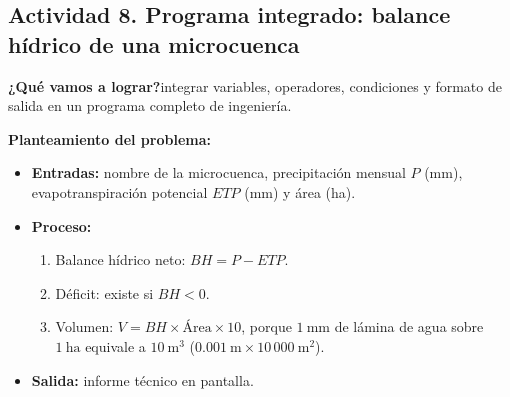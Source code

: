 \documentclass[11pt,a4paper]{article}
\newcommand{\actividad}[1]{\begin{objetivo}\textbf{\color{tealProfundo}¿Qué vamos a lograr?}\enspace #1\end{objetivo}}
\begin{document}
\subsection{Actividad 8. Programa integrado: balance hídrico de una microcuenca}
\actividad{integrar variables, operadores, condiciones y formato de salida en un programa completo de ingeniería.}

\textbf{Planteamiento del problema:}
\begin{itemize}
  \item \textbf{Entradas:} nombre de la microcuenca, precipitación mensual $P$ (mm), evapotranspiración potencial $ETP$ (mm) y área (ha).
  \item \textbf{Proceso:}
  \begin{enumerate}[nosep]
    \item Balance hídrico neto: $BH = P - ETP$.
    \item Déficit: existe si $BH < 0$.
    \item Volumen: $V = BH \times \text{Área} \times 10$, porque $1\ \text{mm}$ de lámina de agua sobre $1\ \text{ha}$ equivale a $10\ \text{m}^3$ ($0.001\ \text{m} \times 10\,000\ \text{m}^2$).
  \end{enumerate}
  \item \textbf{Salida:} informe técnico en pantalla.
\end{itemize}
\end{document}

